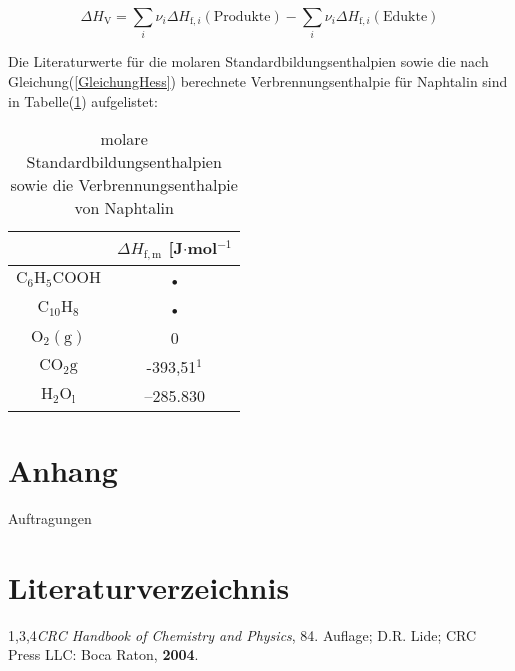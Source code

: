 \documentclass[12pt,a4paper,titlepage,headinclude,bibtotoc]{scrartcl}
\begin{document}
\begin{equation} \label{GleichungHess}
\Delta H_\mathrm{V} = \sum_i \nu_i\Delta H_{\mathrm{f},i}\mathrm{(Produkte)} - \sum_i \nu_i\Delta H_{\mathrm{f},i}\mathrm{(Edukte)}
\end{equation}

Die Literaturwerte für die molaren Standardbildungsenthalpien sowie die nach Gleichung(\ref{GleichungHess}) berechnete Verbrennungsenthalpie für Naphtalin sind in Tabelle(\ref{TABELLELiteraturwerte Bildungsenthalpien}) aufgelistet:\\

\begin{center}
\begin{table} \label{TABELLELiteraturwerte Bildungsenthalpien}
\caption{molare Standardbildungsenthalpien sowie die Verbrennungsenthalpie von Naphtalin}
\begin{tabular}{c|c}
  & $\Delta H_{\mathrm{f,m}}$ [J$\cdot$mol$^{-1}$ \\ 
 \hline 
 $\mathrm{C}_6\mathrm{H}_5\mathrm{COOH}$ & • \\ 
 \hline 
 $\mathrm{C}_{10}\mathrm{H}_8$ & • \\
 \hline 
 $\mathrm{O}_2\mathrm{(g)}$ & 0 \\ 
 \hline 
 $\mathrm{CO}_2\mathrm{g}$ & -393,51$^1$ \\ 
 \hline 
 $\mathrm{H}_2\mathrm{O}_\mathrm{l}$ & –285.830 \\ 
 \end{tabular}  
\end{table}
\end{center}

\section{Anhang}
Auftragungen


\section{Literaturverzeichnis}

1,3,4\quad \emph{CRC Handbook of Chemistry and Physics}, 84. Auflage; D.R. Lide; CRC Press LLC: Boca Raton, \textbf{2004}.
\vspace{0,5 cm}

\end{document}
